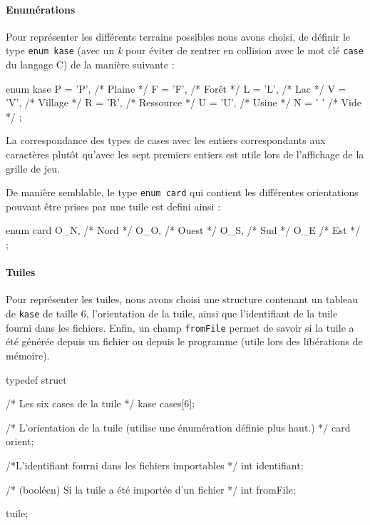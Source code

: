 \documentclass[12pt,a4paper]{article}
\begin{document}
\paragraph{Enumérations\\}

Pour représenter les différents terrains possibles nous avons choisi, de définir le type \texttt{enum kase} (avec un \emph{k} pour éviter de rentrer en collision avec le mot clé \texttt{case} du langage C) de la manière suivante :

\begin{verbatimtab}[4]
enum kase {
	P = 'P', /* Plaine */
	F = 'F', /* Forêt */
	L = 'L', /* Lac */
	V = 'V', /* Village */
	R = 'R', /* Ressource */
	U = 'U', /* Usine */
	N = ' '  /* Vide */
};
\end{verbatimtab}

La correspondance des types de cases avec les entiers correspondants aux caractères plutôt qu'avec les sept premiers entiers est utile lors de l'affichage de la grille de jeu. 

De manière semblable, le type \texttt{enum card} qui contient les différentes orientations pouvant être prises par une tuile est defini ainsi :

\begin{verbatimtab}[4]
enum card{
	O_N,	/* Nord */
	O_O,	/* Ouest */
	O_S,	/* Sud */
	O_E		/* Est */
};
\end{verbatimtab}

\paragraph{Tuiles\\}

Pour représenter les tuiles, nous avons choisi une structure contenant un tableau de \texttt{kase} de taille 6, l'orientation de la tuile, ainsi que l'identifiant de la tuile fourni dans les fichiers. Enfin, un champ \texttt{fromFile} permet de savoir si la tuile a été générée depuis un fichier ou depuis le programme (utile lors des libérations de mémoire).

\begin{verbatimtab}[4]
typedef struct {
	/* Les six cases de la tuile */
	kase cases[6];
    
    /* L'orientation de la tuile (utilise une énumération définie plus haut.) */
	card orient; 
    
    /*L'identifiant fourni dans les fichiers importables */
	int identifiant;
    
    /* (booléen) Si la tuile a été importée d'un fichier */
    int fromFile;
} tuile;
\end{verbatimtab}
\end{document}
